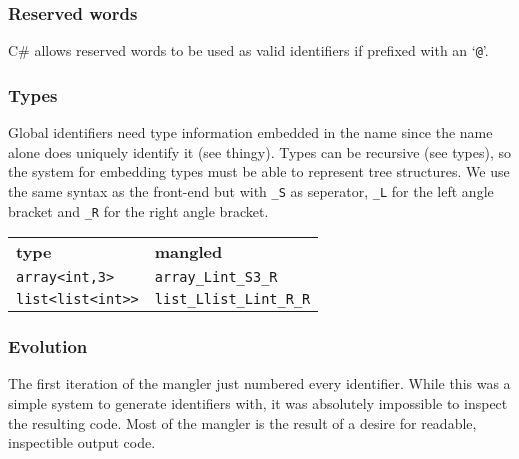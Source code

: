 \subsubsection{Reserved words}
C\# allows reserved words to be used as valid identifiers if prefixed with an `\verb|@|'\cite{msdn_identifiers}.

\subsubsection{Types}
Global identifiers need type information embedded in the name since the name alone does uniquely identify it (see thingy).
Types can be recursive (see types), so the system for embedding types must be able to represent tree structures.
We use the same syntax as the front-end but with \verb|_S| as seperator, \verb|_L| for the left angle bracket and \verb|_R| for the right angle bracket.

{\footnotesize
\begin{tabular}{ll}
\textbf{\normalsize type}          & \textbf{\normalsize mangled} \\
\verb|array<int,3>|    & \verb|array_Lint_S3_R| \\
\verb|list<list<int>>| & \verb|list_Llist_Lint_R_R| \\
\end{tabular}
}

\subsubsection{Evolution}
The first iteration of the mangler just numbered every identifier.
While this was a simple system to generate identifiers with, it was absolutely impossible to inspect the resulting code.
Most of the mangler is the result of a desire for readable, inspectible output code.
